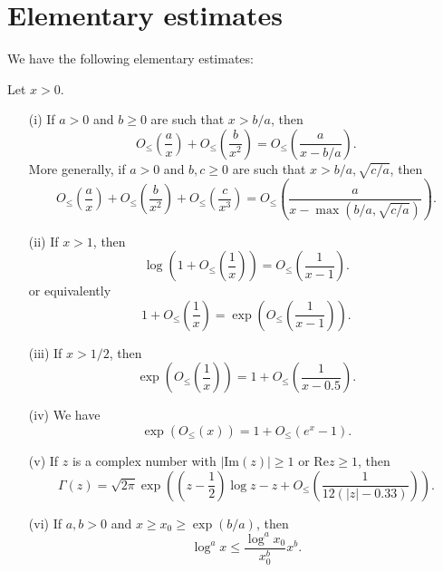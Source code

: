 \section{Elementary estimates}

We have the following elementary estimates:

\begin{lemma}\label{elem-lem} Let $x > 0$.
\begin{itemize}
\item[(i)] If $a > 0$ and $b \geq 0$ are such that $x > b/a$, then
$$O_{\leq}(\frac{a}{x}) + O_{\leq}( \frac{b}{x^2} ) = O_{\leq}( \frac{a}{x-b/a} ).$$
More generally, if $a > 0$ and $b,c \geq 0$ are such that $x > b/a, \sqrt{c/a}$, then
$$O_{\leq}(\frac{a}{x}) + O_{\leq}( \frac{b}{x^2} ) + O_{\leq}( \frac{c}{x^3}) = O_{\leq}( \frac{a}{x-\max(b/a,\sqrt{c/a})} ).$$
\item[(ii)]  If $x > 1$, then
$$\log(1 + O_{\leq}(\frac{1}{x}) ) = O_{\leq}(\frac{1}{x-1}).$$
or equivalently
$$1 + O_{\leq}(\frac{1}{x}) = \exp( O_{\leq}(\frac{1}{x-1}) ).$$
\item[(iii)]  If $x > 1/2$, then
$$\exp( O_{\leq}(\frac{1}{x}) ) = 1 + O_{\leq}( \frac{1}{x-0.5} ).$$
\item[(iv)]  We have
$$ \exp(O_{\leq}(x)) = 1 + O_{\leq}(e^x-1).$$
\item[(v)] If $z$ is a complex number with $|\mathrm{Im}(z)| \geq 1$ or $\mathrm{Re} z \geq 1$, then
$$ \Gamma(z) = \sqrt{2\pi} \exp( (z-\frac{1}{2}) \log z - z + O_{\leq}( \frac{1}{12(|z| - 0.33)} )).$$
\item[(vi)] If $a,b > 0$ and $x \geq x_0 \geq \exp(b/a)$, then
$$\log^a x \leq \frac{\log^a x_0}{x_0^b} x^b.$$
\end{itemize}
\end{lemma}

